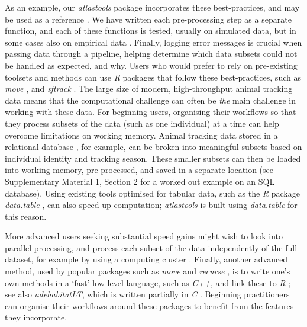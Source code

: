     As an example, our \textit{atlastools} package incorporates these best-practices, and may be used as a reference \citep[][]{gupte2020a}.
    We have written each pre-processing step as a separate function, and each of these functions is tested, usually on simulated data, but in some cases also on empirical data \citep[][see the directory \textit{tests/} in the associated Zenodo repository]{wickham2015}.
    Finally, logging error messages is crucial when passing data through a pipeline, helping determine which data subsets could not be handled as expected, and why.
    Users who would prefer to rely on pre-existing toolsets and methods can use \textit{R} packages that follow these best-practices, such as \textit{move} \citep{kranstauber2011}, and \textit{sftrack} \citep{boone2020}.
    The large size of modern, high-throughput animal tracking data means that the computational challenge can often be \textit{the} main challenge in working with these data.
    For beginning users, organising their workflows so that they process subsets of the data (such as one individual) at a time can help overcome limitations on working memory.
    Animal tracking data stored in a relational database \citep[e.g. SQL databases][]{codd1970}, for example, can be broken into meaningful subsets based on individual identity and tracking season.
    These smaller subsets can then be loaded into working memory, pre-processed, and saved in a separate location (see Supplementary Material 1, Section 2 for a worked out example on an SQL database).
    Using existing tools optimised for tabular data, such as the \textit{R} package \textit{data.table} \citep{dowle2020}, can also speed up computation; \textit{atlastools} is built using \textit{data.table} for this reason.

    More advanced users seeking substantial speed gains might wish to look into parallel-processing, and process each subset of the data independently of the full dataset, for example by using a computing cluster \citep[see also][for an alternative]{zjdai2021}.
    Finally, another advanced method, used by popular packages such as \textit{move} \citep{kranstauber2011} and \textit{recurse} \citep{bracis2018}, is to write one's own methods in a `fast' low-level language, such as \textit{C++}, and link these to \textit{R} \citep[][]{eddelbuettel2013}; see also \textit{adehabitatLT}, which is written partially in \textit{C} \citep{calenge2006}.
    Beginning practitioners can organise their workflows around these packages to benefit from the features they incorporate.

